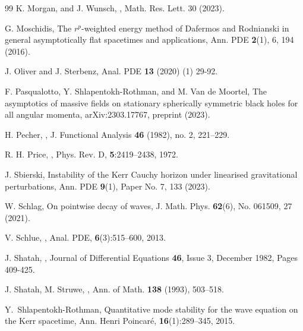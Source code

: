 \documentclass[10pt,a4paper,reqno]{amsart}
\theoremstyle{definition}
\theoremstyle{remark}
\numberwithin{equation}{section}
\begin{document}
\begin{thebibliography}{99}
 K. Morgan, and J. Wunsch, 
,
\newblock Math. Res. Lett. 30 (2023).

 G. Moschidis,
\newblock The $r^p$-weighted energy method of Dafermos and Rodnianski in general asymptotically flat spacetimes and applications,
\newblock Ann. PDE \textbf{2}(1), 6, 194 (2016).


J. Oliver and J. Sterbenz,
\newblock Anal. PDE \textbf{13} (2020) (1) 29-92. 

 F. Pasqualotto, Y. Shlapentokh-Rothman, and M. Van de Moortel,
\newblock The asymptotics of massive fields on stationary spherically symmetric black holes for all angular momenta,
\newblock arXiv:2303.17767, preprint (2023).

 H. Pecher,
,
\newblock J. Functional Analysis \textbf{46} (1982), no. 2, 221--229.

 R. H. Price, 
,
\newblock Phys. Rev. D, \textbf{5}:2419--2438, 1972.

 J. Sbierski,
\newblock Instability of the Kerr Cauchy horizon under linearised gravitational perturbations,
\newblock Ann. PDE \textbf{9}(1), Paper No. 7, 133 (2023). %

 W. Schlag,
\newblock On pointwise decay of waves,
\newblock J. Math. Phys. \textbf{62}(6), No. 061509, 27 (2021).

 V. Schlue,
,
\newblock Anal. PDE, \textbf{6}(3):515–600, 2013.


 J. Shatah,
,
\newblock Journal of Differential Equations \textbf{46}, Issue 3, December 1982, Pages 409-425.

 J. Shatah, M. Struwe,
,
\newblock Ann. of Math. \textbf{138} (1993), 503–518.



 Y.~Shlapentokh-Rothman,
\newblock Quantitative mode stability for the wave equation on the Kerr spacetime,
\newblock Ann. Henri Poincaré, \textbf{16}(1):289--345, 2015.


\end{thebibliography}
\end{document}
